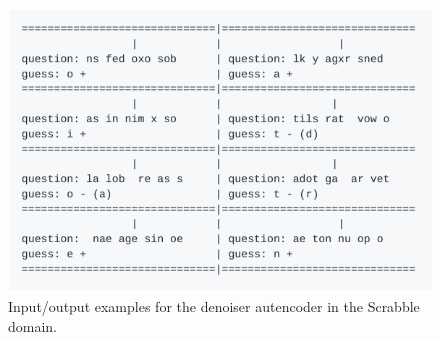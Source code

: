 \begin{figure}
  \includegraphics[width=\linewidth]{img/scrabble_denoiser_examples}
  \caption{Input/output examples for the denoiser autencoder in the Scrabble domain.}
  \label{fig:scrabble_denoiser}
\end{figure}
